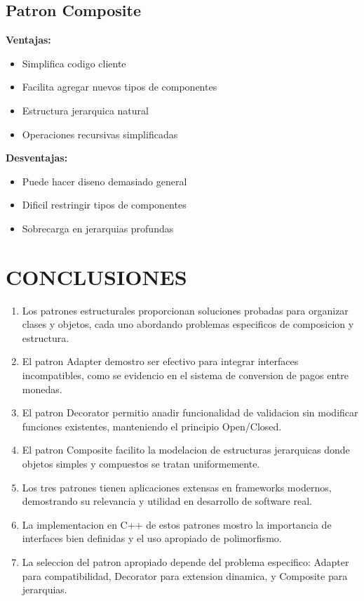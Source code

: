 \documentclass[11pt,a4paper]{article}
\begin{document}
\subsection{Patron Composite}

\textbf{Ventajas:}
\begin{itemize}
    \item Simplifica codigo cliente
    \item Facilita agregar nuevos tipos de componentes
    \item Estructura jerarquica natural
    \item Operaciones recursivas simplificadas
\end{itemize}

\textbf{Desventajas:}
\begin{itemize}
    \item Puede hacer diseno demasiado general
    \item Dificil restringir tipos de componentes
    \item Sobrecarga en jerarquias profundas
\end{itemize}

\section{CONCLUSIONES}

\begin{enumerate}
    \item Los patrones estructurales proporcionan soluciones probadas para organizar clases y objetos, cada uno abordando problemas especificos de composicion y estructura.
    
    \item El patron Adapter demostro ser efectivo para integrar interfaces incompatibles, como se evidencio en el sistema de conversion de pagos entre monedas.
    
    \item El patron Decorator permitio anadir funcionalidad de validacion sin modificar funciones existentes, manteniendo el principio Open/Closed.
    
    \item El patron Composite facilito la modelacion de estructuras jerarquicas donde objetos simples y compuestos se tratan uniformemente.
    
    \item Los tres patrones tienen aplicaciones extensas en frameworks modernos, demostrando su relevancia y utilidad en desarrollo de software real.
    
    \item La implementacion en C++ de estos patrones mostro la importancia de interfaces bien definidas y el uso apropiado de polimorfismo.
    
    \item La seleccion del patron apropiado depende del problema especifico: Adapter para compatibilidad, Decorator para extension dinamica, y Composite para jerarquias.
\end{enumerate}
\end{document}
